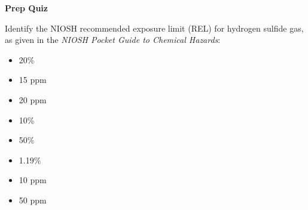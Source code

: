\vfil \eject

\noindent
{\bf Prep Quiz}

Identify the NIOSH recommended exposure limit (REL) for hydrogen sulfide gas, as given in the {\it NIOSH Pocket Guide to Chemical Hazards}:

\begin{itemize}
\item{} 20\%
\vskip 5pt
\item{} 15 ppm
\vskip 5pt
\item{} 20 ppm
\vskip 5pt
\item{} 10\%
\vskip 5pt
\item{} 50\%
\vskip 5pt
\item{} 1.19\%
\vskip 5pt
\item{} 10 ppm
\vskip 5pt
\item{} 50 ppm
\end{itemize}





